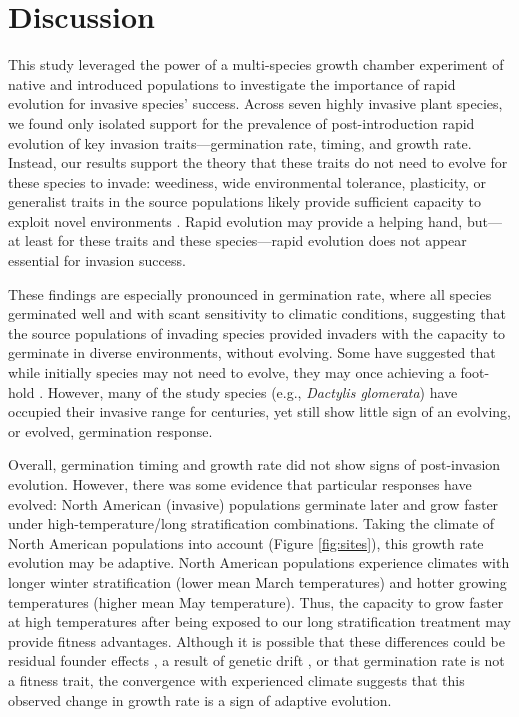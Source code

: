 \documentclass[12pt]{article}\usepackage[]{graphicx}\usepackage[]{color}
\begin{document}
	\section{Discussion}
	
	This study leveraged the power of a multi-species growth chamber experiment of native and introduced populations to investigate the importance of rapid evolution for invasive species' success. Across seven highly invasive plant species, we found only isolated support for the prevalence of post-introduction rapid evolution of key invasion traits---germination rate, timing, and growth rate. Instead, our results support the theory that these traits do not need to evolve for these species to invade: weediness, wide environmental tolerance, plasticity, or generalist traits in the source populations likely provide sufficient capacity to exploit novel environments \parencite{Baker1965}. Rapid evolution may provide a helping hand, but---at least for these traits and these species---rapid evolution does not appear essential for invasion success.
	
	These findings are especially pronounced in germination rate, where all species germinated well and with scant sensitivity to climatic conditions, suggesting that the source populations of invading species provided invaders with the capacity to germinate in diverse environments, without evolving. Some have suggested that while initially species may not need to evolve, they may once achieving a foot-hold \parencite{Lamarque2015}. However, many of the study species (e.g., \textit{Dactylis glomerata}) have occupied their invasive range for centuries, yet still show little sign of an evolving, or evolved, germination response. 
	
	Overall, germination timing and growth rate did not show signs of post-invasion evolution. However, there was some evidence that particular responses have evolved: North American (invasive) populations germinate later and grow faster under high-temperature/long stratification combinations. Taking the climate of North American populations into account (Figure \ref{fig:sites}), this growth rate evolution may be adaptive. North American populations experience climates with longer winter stratification  (lower mean March temperatures) and hotter growing temperatures (higher mean May temperature). Thus, the capacity to grow faster at high temperatures after being exposed to our long stratification treatment may provide fitness advantages. Although it is  possible that these differences could be residual founder effects \parencite{Shirk2014}, a result of genetic drift \parencite{Eckert1996}, or that germination rate is not a fitness trait,  the convergence with experienced climate suggests that this observed change in growth rate is a sign of adaptive evolution. 
	
\end{document}
